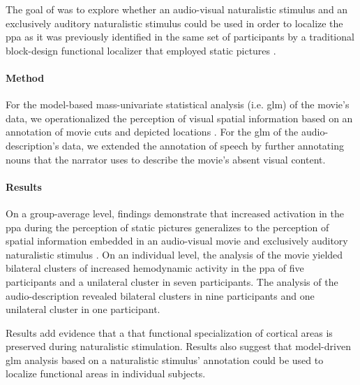 The goal of \citet{haeusler2022processing} was to explore whether an
audio-visual naturalistic stimulus and an exclusively auditory naturalistic
stimulus could be used in order to localize the \ac{ppa} as it was previously
identified in the same set of participants by a traditional block-design
functional localizer that employed static pictures
\citep{sengupta2016extension}.


\paragraph{Method}

For the model-based mass-univariate statistical analysis (i.e. \ac{glm}) of the
movie's data, we operationalized the perception of visual spatial information
based on an annotation of movie cuts and depicted locations
\citep{haeusler2016cutanno}.
For the \ac{glm} of the audio-description's data, we extended the annotation of
speech \citep{haeusler2021speechanno} by further annotating nouns that the
narrator uses to describe the movie's absent visual content.


\paragraph{Results}


On a group-average level, findings demonstrate that increased activation in the
\ac{ppa} during the perception of static pictures generalizes to the perception
of spatial information embedded in an audio-visual movie and exclusively
auditory naturalistic stimulus \citep{haeusler2022processing}.
On an individual level, the analysis of the movie yielded bilateral
clusters of increased hemodynamic activity in the \ac{ppa} of five participants
and a unilateral cluster in seven participants.
%
The analysis of the audio-description revealed bilateral clusters in nine
participants and one unilateral cluster in one participant.

Results add evidence \citep[cf.][]{bartels2004mapping} that a that functional
specialization of cortical areas is preserved during naturalistic stimulation.
%
Results also suggest that model-driven \ac{glm} analysis based on a naturalistic
stimulus' annotation could be used to localize functional areas in individual
subjects.

